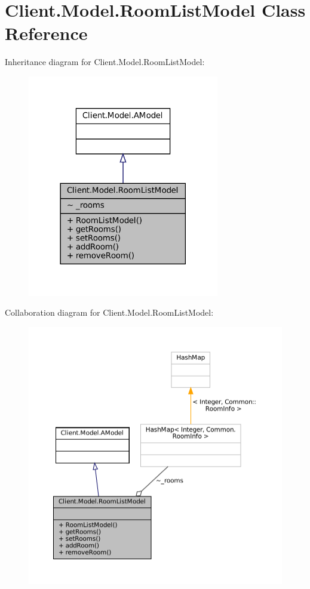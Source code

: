 \hypertarget{classClient_1_1Model_1_1RoomListModel}{}\section{Client.\+Model.\+Room\+List\+Model Class Reference}
\label{classClient_1_1Model_1_1RoomListModel}


Inheritance diagram for Client.\+Model.\+Room\+List\+Model\+:
\nopagebreak
\begin{figure}[H]
\begin{center}
\leavevmode
\includegraphics[width=237pt]{classClient_1_1Model_1_1RoomListModel__inherit__graph}
\end{center}
\end{figure}


Collaboration diagram for Client.\+Model.\+Room\+List\+Model\+:
\nopagebreak
\begin{figure}[H]
\begin{center}
\leavevmode
\includegraphics[width=350pt]{classClient_1_1Model_1_1RoomListModel__coll__graph}
\end{center}
\end{figure}
